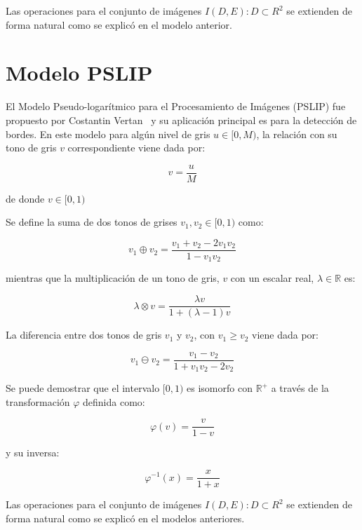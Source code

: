Las operaciones para el conjunto de im\'agenes $I(D,E):D\subset R^2$ se extienden de forma natural como se explic\'o en el modelo anterior.

\section{Modelo PSLIP}

El Modelo Pseudo-logar\'itmico para el Procesamiento de Im\'agenes (PSLIP) fue propuesto por Costantin Vertan~\cite{vertan2008pseudo} y su aplicaci\'on principal es para la detecci\'on de bordes. En este modelo para alg\'un nivel de gris $u\in[0,M)$, la relaci\'on con su tono de gris $v$ correspondiente viene dada por:

\begin{equation}
	v = \frac{u}{M}
\end{equation}

de donde $v\in[0,1)$

Se define la suma de dos tonos de grises $v_1,v_2\in[0,1)$ como:

\begin{equation}
	v_1\oplus v_2=\frac{v_1 + v_2 - 2v_1v_2}{1-v_1v_2}
\end{equation}

mientras que la multiplicación de un tono de gris, $v$ con un escalar real, $\lambda \in \mathbb{R}$ es:

\begin{equation}
	\lambda \otimes v = \frac{\lambda v}{1+(\lambda-1)v}
\end{equation}

La diferencia entre dos tonos de gris $v_1$ y $v_2$, con $v_1 \geq v_2$ viene dada por:

\begin{equation}
	v_1\ominus v_2=\frac{v_1-v_2}{1+v_1v_2-2v_2}
\end{equation}

Se puede demostrar que el intervalo $[0, 1)$ es isomorfo con $\mathbb{R}^+$ a través de la transformaci\'on $\varphi$ definida como:

\begin{equation}
	\varphi(v)=\frac{v}{1-v}
\end{equation}

y su inversa:

\begin{equation}
	\varphi^{-1}(x)=\frac{x}{1+x}
\end{equation}

Las operaciones para el conjunto de im\'agenes $I(D,E):D\subset R^2$ se extienden de forma natural como se explic\'o en el modelos anteriores.

